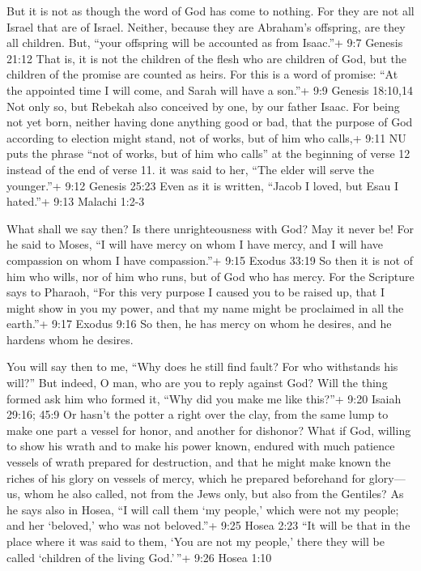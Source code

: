  But it is not as though the word of God has come to
nothing. For they are not all Israel that are of Israel. 
Neither, because they are Abraham's offspring, are they all children.
But, ``your offspring will be accounted as from Isaac.''+ 9:7 Genesis
21:12  That is, it is not the children of the flesh who are
children of God, but the children of the promise are counted as heirs.
 For this is a word of promise: ``At the appointed time I
will come, and Sarah will have a son.''+ 9:9 Genesis 18:10,14
 Not only so, but Rebekah also conceived by one, by our
father Isaac.  For being not yet born, neither having done
anything good or bad, that the purpose of God according to election
might stand, not of works, but of him who calls,+ 9:11 NU puts the
phrase ``not of works, but of him who calls'' at the beginning of verse
12 instead of the end of verse 11.  it was said to her,
``The elder will serve the younger.''+ 9:12 Genesis 25:23 
Even as it is written, ``Jacob I loved, but Esau I hated.''+ 9:13
Malachi 1:2-3

 What shall we say then? Is there unrighteousness with God?
May it never be!  For he said to Moses, ``I will have mercy
on whom I have mercy, and I will have compassion on whom I have
compassion.''+ 9:15 Exodus 33:19  So then it is not of him
who wills, nor of him who runs, but of God who has mercy. 
For the Scripture says to Pharaoh, ``For this very purpose I caused you
to be raised up, that I might show in you my power, and that my name
might be proclaimed in all the earth.''+ 9:17 Exodus 9:16 
So then, he has mercy on whom he desires, and he hardens whom he
desires.

 You will say then to me, ``Why does he still find fault?
For who withstands his will?''  But indeed, O man, who are
you to reply against God? Will the thing formed ask him who formed it,
``Why did you make me like this?''+ 9:20 Isaiah 29:16; 45:9
 Or hasn't the potter a right over the clay, from the same
lump to make one part a vessel for honor, and another for dishonor?
 What if God, willing to show his wrath and to make his
power known, endured with much patience vessels of wrath prepared for
destruction,  and that he might make known the riches of
his glory on vessels of mercy, which he prepared beforehand for glory---
 us, whom he also called, not from the Jews only, but also
from the Gentiles?  As he says also in Hosea, ``I will call
them `my people,' which were not my people; and her `beloved,' who was
not beloved.''+ 9:25 Hosea 2:23  ``It will be that in the
place where it was said to them, `You are not my people,' there they
will be called `children of the living God.'\,''+ 9:26 Hosea 1:10

